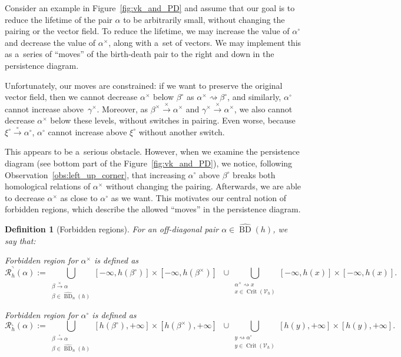 \documentclass[a4paper,12pt, USenglish,cleveref,autoref,thm-restate]{article}
\newtheorem{definition}[theorem]{Definition}
\newcommand{\mf}{h}
\DeclareMathOperator{\bd}{BD}
\newcommand{\upbd}{\hat{\bd}}
\newcommand{\fhR}{\mathcal{R}^\urcorner}
\newcommand{\fcR}{\mathcal{R}^\llcorner}
\newcommand{\cx}{x}
\newcommand{\cy}{y}
\newcommand{\bth}[1]{#1^\circ}
\newcommand{\dth}[1]{#1^{\!\times}}
\newcommand{\homo}{\xrightarrow{\times}}
\newcommand{\cohomo}{\xrightarrow{\circ}}
\newcommand{\bds}{\alpha}
\newcommand{\bdt}{\beta}
\newcommand{\bdb}{\gamma}
\newcommand{\cV}{\mathcal{V}}
\def\pathh#1{\overset{#1}{\rightsquigarrow}}
\DeclareMathOperator{\crit}{Crit}
\def\pathh#1{\overset{#1}{\rightsquigarrow}}
\begin{document}
Consider an example in Figure~\ref{fig:vk_and_PD} and assume that our goal is to reduce the lifetime of the pair $\bds$ to be arbitrarily small, without changing the pairing or the vector field. 
To reduce the lifetime, we may increase the value of $\bth\bds$ and decrease the value of $\dth\bds$, along with a~set of vectors. We        may implement this as a~series of ``moves'' of the birth-death pair to the right and down in the persistence diagram.

\noindent Unfortunately, our moves are constrained:
if we want to preserve the original vector field, then we cannot decrease $\dth\bds$ below $\bth\bdt$ as $\dth\bds \pathh{} \bth\bdt$, and similarly, $\bth\bds$ cannot increase above~$\dth\bdb$. Moreover, as $\dth\bdt \homo \dth\bds$ and $\dth\bdb \homo \dth\bds$, we also cannot decrease $\dth\bds$  below these levels, without switches in pairing. Even worse, because $\bth\xi \cohomo \bth\bds$, $\bth\bds$ cannot increase above $\bth\xi$ without another switch.

\noindent This appears to be a~serious obstacle. However, when we examine the persistence diagram (see bottom part of the  Figure~\ref{fig:vk_and_PD}), we notice, following Observation~\ref{obs:left_up_corner}, that increasing $\bth\bds$ above $\bth\bdt$ breaks both homological relations of $\dth\bds$ without changing the pairing. 
Afterwards, we are able to decrease $\dth\bds$ as close to $\bth\bds$ as we want. This motivates our central notion of forbidden regions, which describe the allowed ``moves'' in the persistence diagram.

\begin{definition}[Forbidden regions]
    For an off-diagonal pair $\bds \in \upbd(\mf)$, we say that:

    \begin{bracketenumerate}


        \item  \emph{Forbidden region for} $\dth\bds$ is defined as
        \[\fhR_{\mf}(\bds):= \bigcup\limits_{\substack{\bdt \homo \bds \\ \bdt \in \upbd_{n}(\mf)}}[-\infty, \mf(\bth\bdt)] \times [-\infty, \mf(\dth\bdt)] \;\;\cup \bigcup\limits_{\substack{\dth\bds \pathh{} \cx \\ \cx \in \crit(\cV_{\mf}) }}[-\infty,\mf(x)] \times[-\infty,\mf(x)].\]

        \item \emph{Forbidden region for} $\bth\bds$ is defined as
        \[\fcR_{\mf}(\bds) := \bigcup\limits_{\substack{\bdt \cohomo \bds \\ \bdt \in \upbd_{n}(\mf)}}[\mf(\bth\bdt), +\infty] \times [\mf(\dth\bdt), +\infty] \;\; \cup \bigcup\limits_{ \substack{\cy \pathh{} \bth\bds \\ \cy \in \crit(\cV_{\mf})}}[\mf(y),+\infty] \times[\mf(y),+\infty].\] 

    \end{bracketenumerate}
\end{definition}
\end{document}
